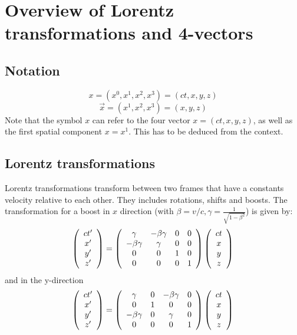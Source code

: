 \section{Overview of Lorentz transformations and 4-vectors}
\label{sec:ltqs}
\subsection{Notation}
\[ x = (x^0, x^1, x^2, x^3) = (ct, x, y, z)\]
\[
\vec{x} = (x^1, x^2, x^3) = (x, y, z)
\]
Note that the symbol $x$ can refer to the four vector $x=(ct, x, y, z)$, as well as the first spatial component $x=x^1$. This has to be deduced from the context.
\subsection{Lorentz transformations}
Lorentz transformations transform between two frames that have a constants velocity relative to each other. They includes rotations, shifts and boosts.
The transformation for a boost in $x$ direction (with $\beta = v/c, \gamma = \frac{1}{\sqrt{1-\beta^2}}$) is given by:
\begin{equation}
 \left( \begin{array}{c} ct^{\prime} \\ x^{\prime} \\ y^{\prime} \\ z^{\prime}\end{array} \right)= 
      \left( \begin{array}{cccc} \gamma       & -\beta\gamma &  0  & 0  \\ 
                                 -\beta\gamma &  \gamma      &  0  & 0  \\
                                        0     &    0         &  1  & 0  \\
                                        0     &    0         &  0  & 1
             \end{array} \right) \left( \begin{array}{c} ct \\ x \\ y \\ z\end{array} \right) 
\end{equation}
and in the y-direction
\begin{equation}
 \left( \begin{array}{c} ct^{\prime} \\ x^{\prime} \\ y^{\prime} \\ z^{\prime}\end{array} \right)= 
      \left( \begin{array}{cccc} \gamma       &   0 & -\beta\gamma &  0  \\ 
                                     0        &   1 &   0 & 0  \\
                                 -\beta\gamma &   0 & \gamma     & 0  \\
                                        0     &    0         &  0  & 1

             \end{array} \right) \left( \begin{array}{c} ct \\ x \\ y \\ z\end{array} \right) 
\end{equation}
